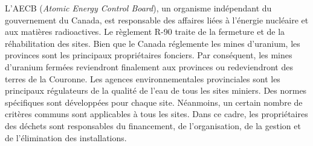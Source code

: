 \documentclass{article}
\begin{document}
L'AECB (\textit{Atomic Energy Control Board}), un organisme indépendant du gouvernement du Canada, est responsable des affaires liées à l'énergie nucléaire et aux matières radioactives. Le règlement R-90 traite de la fermeture et de la réhabilitation des sites. Bien que le Canada réglemente les mines d'uranium, les provinces sont les principaux propriétaires fonciers. Par conséquent, les mines d'uranium fermées reviendront finalement aux provinces ou redeviendront des terres de la Couronne. Les agences environnementales provinciales sont les principaux régulateurs de la qualité de l'eau de tous les sites miniers.
Des normes spécifiques sont développées pour chaque site. Néanmoins, un certain nombre de critères communs sont applicables à tous les sites.
Dans ce cadre, les propriétaires des déchets sont responsables du financement, de l'organisation, de la gestion et de l’élimination des installations.
\end{document}

